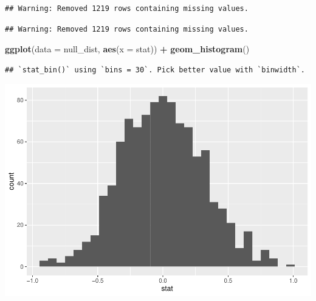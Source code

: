 \documentclass[
]{article}
\newenvironment{Shaded}{\begin{snugshade}}{\end{snugshade}}
\newcommand{\DataTypeTok}[1]{\textcolor[rgb]{0.13,0.29,0.53}{#1}}
\newcommand{\DecValTok}[1]{\textcolor[rgb]{0.00,0.00,0.81}{#1}}
\newcommand{\KeywordTok}[1]{\textcolor[rgb]{0.13,0.29,0.53}{\textbf{#1}}}
\newcommand{\NormalTok}[1]{#1}
\newcommand{\OperatorTok}[1]{\textcolor[rgb]{0.81,0.36,0.00}{\textbf{#1}}}
\newcommand{\StringTok}[1]{\textcolor[rgb]{0.31,0.60,0.02}{#1}}
\begin{document}
\begin{verbatim}
## Warning: Removed 1219 rows containing missing values.
\end{verbatim}

\begin{Shaded}
\end{Shaded}

\begin{verbatim}
## Warning: Removed 1219 rows containing missing values.
\end{verbatim}

\begin{Shaded}
\begin{Highlighting}[]
\KeywordTok{ggplot}\NormalTok{(}\DataTypeTok{data =}\NormalTok{ null_dist, }\KeywordTok{aes}\NormalTok{(}\DataTypeTok{x =}\NormalTok{ stat)) }\OperatorTok{+}
\StringTok{  }\KeywordTok{geom_histogram}\NormalTok{()}
\end{Highlighting}
\end{Shaded}

\begin{verbatim}
## `stat_bin()` using `bins = 30`. Pick better value with `binwidth`.
\end{verbatim}

\includegraphics{lab_7_files/figure-latex/unnamed-chunk-8-1.pdf}
\end{document}
